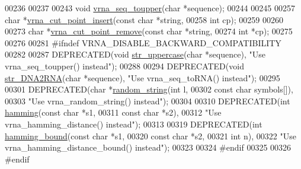 \begin{DoxyCode}
00236 
00237 
00243 \textcolor{keywordtype}{void} \hyperlink{group__string__utils_ga4f44dca03c9d708d68e64c0610bb9091}{vrna\_seq\_toupper}(\textcolor{keywordtype}{char} *sequence);
00244 
00245 
00257 \textcolor{keywordtype}{char} *\hyperlink{group__string__utils_ga74f05ece32ea73b59f84a7452afd5fae}{vrna\_cut\_point\_insert}(\textcolor{keyword}{const} \textcolor{keywordtype}{char}  *\textcolor{keywordtype}{string},
00258                             \textcolor{keywordtype}{int}         cp);
00259 
00260 
00273 \textcolor{keywordtype}{char} *\hyperlink{group__string__utils_ga1fbd821d4408cc5f1dd9d12c15e092cb}{vrna\_cut\_point\_remove}(\textcolor{keyword}{const} \textcolor{keywordtype}{char}  *\textcolor{keywordtype}{string},
00274                             \textcolor{keywordtype}{int}         *cp);
00275 
00276 
00281 \textcolor{preprocessor}{#ifndef VRNA\_DISABLE\_BACKWARD\_COMPATIBILITY}
00282 
00287 DEPRECATED(\textcolor{keywordtype}{void}  \hyperlink{string__utils_8h_a17b796b806f96b70382077fb5bc519bb}{str\_uppercase}(\textcolor{keywordtype}{char} *sequence), \textcolor{stringliteral}{"Use vrna\_seq\_toupper() instead"});
00288 
00294 DEPRECATED(\textcolor{keywordtype}{void} \hyperlink{string__utils_8h_ad3f18dd83f958f18b2f26ecb99305208}{str\_DNA2RNA}(\textcolor{keywordtype}{char} *sequence), \textcolor{stringliteral}{"Use vrna\_seq\_toRNA() instead"});
00295 
00301 DEPRECATED(\textcolor{keywordtype}{char} *\hyperlink{string__utils_8h_a1b95eac365a021572e1c37e5993a89be}{random\_string}(\textcolor{keywordtype}{int}        l,
00302                                \textcolor{keyword}{const} \textcolor{keywordtype}{char} symbols[]),
00303 \textcolor{stringliteral}{"Use vrna\_random\_string() instead"});
00304 
00310 DEPRECATED(\textcolor{keywordtype}{int} \hyperlink{string__utils_8h_ad9dc7bfc9aa664dc6698f17ce07fc7e7}{hamming}(\textcolor{keyword}{const} \textcolor{keywordtype}{char} *s1,
00311                        \textcolor{keyword}{const} \textcolor{keywordtype}{char} *s2),
00312 \textcolor{stringliteral}{"Use vrna\_hamming\_distance() instead"});
00313 
00319 DEPRECATED(\textcolor{keywordtype}{int} \hyperlink{string__utils_8h_a96d3c36717d624514055ce201cab1542}{hamming\_bound}(\textcolor{keyword}{const} \textcolor{keywordtype}{char} *s1,
00320                              \textcolor{keyword}{const} \textcolor{keywordtype}{char} *s2,
00321                              \textcolor{keywordtype}{int}        n),
00322 \textcolor{stringliteral}{"Use vrna\_hamming\_distance\_bound() instead"});
00323 
00324 \textcolor{preprocessor}{#endif}
00325 
00326 \textcolor{preprocessor}{#endif}
\end{DoxyCode}
